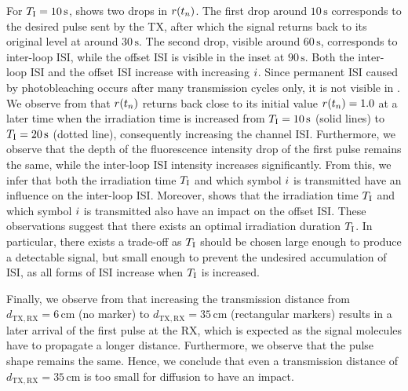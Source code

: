 For $T_{\mathrm{I}}= 10 \,\si{\second}$,  shows two drops in $r(t_n)$. The first drop around $10\, \si{\second}$ corresponds to the desired pulse sent by the \ac{TX}, after which the signal returns back to its original level at around $30\, \si{\second}$. The second drop, visible around $60\, \si{\second}$, corresponds to inter-loop \ac{ISI}, while the offset \ac{ISI} is visible in the inset at $90 \, \si{\second}$.
Both the inter-loop \ac{ISI} and the offset \ac{ISI} increase with increasing $i$. 
Since permanent \ac{ISI} caused by photobleaching occurs after many transmission cycles only, it is not visible in .
We observe from  that $r(t_n)$ returns back close to its initial value $r(t_n) = 1.0$ at a later time when the irradiation time is increased from $T_{\mathrm{I}} = 10 \, \si{\second}$ (solid lines) to $T_{\mathrm{I}} = 20 \, \si{\second}$ (dotted line), consequently increasing the channel \ac{ISI}. Furthermore, we observe that the depth of the fluorescence intensity drop of the first pulse remains the same, while the inter-loop \ac{ISI} intensity increases significantly. From this, we infer that both the irradiation time $T_{\mathrm{I}}$ and which symbol $i$ is transmitted have an influence on the inter-loop \ac{ISI}. 
Moreover,  shows that the irradiation time $T_{\mathrm{I}}$ and which symbol $i$ is transmitted also have an impact on the offset \ac{ISI}.
%
These observations suggest that there exists an optimal irradiation duration $T_{\mathrm{I}}$. In particular, there exists a trade-off as $T_{\mathrm{I}}$ should be chosen large enough to produce a detectable signal, but small enough to prevent the undesired accumulation of \ac{ISI}, as all forms of \ac{ISI} increase when $T_{\mathrm{I}}$ is increased.

Finally, we observe from  that increasing the transmission distance from $d_{\mathrm{TX},\mathrm{RX}} = 6 \, \si{\centi\meter}$ (no marker) to $d_{\mathrm{TX},\mathrm{RX}} = 35 \, \si{\centi\meter}$ (rectangular markers) results in a later arrival of the first pulse at the \ac{RX}, which is expected as the signal molecules have to propagate a longer distance. Furthermore, we observe that the pulse shape remains the same. Hence, we conclude that even a transmission distance of $d_{\mathrm{TX},\mathrm{RX}} = 35 \, \si{\centi\meter}$ is too small for diffusion to have an impact.
\scaleSubsection
